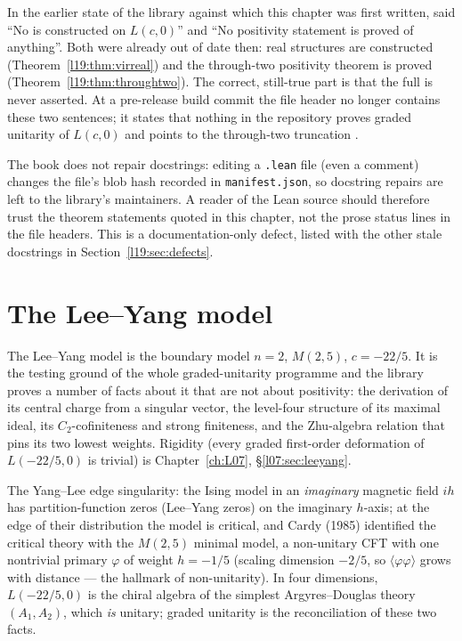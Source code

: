 \begin{warning}[title={Stale status lines in the Virasoro docstrings}]\label{l19:warn:stale}
In the earlier state of the library against which this chapter was first written,
 said ``No  is constructed on
$L(c,0)$'' and ``No positivity statement is proved of anything''. Both were already out of date then: real
structures are constructed (Theorem~\ref{l19:thm:virreal}) and the through-two
positivity theorem is proved (Theorem~\ref{l19:thm:throughtwo}). The correct, still-true part is that the
full  is never asserted. At a pre-release build commit the file header no longer contains these two
sentences; it states that nothing in the repository proves graded unitarity of $L(c,0)$ and points to the
through-two truncation .

The book does not repair docstrings: editing a \texttt{.lean} file (even a comment) changes the file's blob hash
recorded in \texttt{manifest.json}, so docstring repairs are left to the library's maintainers. A reader of the
Lean source should therefore trust the theorem statements quoted in this chapter, not the prose status lines in
the file headers. This is a documentation-only defect, listed with the other stale docstrings in
Section~\ref{l19:sec:defects}.
\end{warning}

\section{The Lee--Yang model}\label{l19:sec:leeyang}

The Lee--Yang model is the boundary model $n=2$, $M(2,5)$, $c = -22/5$. It is the testing ground
of the whole graded-unitarity programme and the library proves a number of facts about it that are
not about positivity: the derivation of its central charge from a singular vector, the level-four
structure of its maximal ideal, its $C_2$-cofiniteness and strong finiteness, and the Zhu-algebra
relation that pins its two lowest weights. Rigidity (every graded first-order deformation of
$L(-22/5,0)$ is trivial) is Chapter~\ref{ch:L07}, \S\ref{l07:sec:leeyang}.

\begin{physics}
The Yang--Lee edge singularity: the Ising model in an \emph{imaginary} magnetic field $ih$ has
partition-function zeros (Lee--Yang zeros) on the imaginary $h$-axis; at the edge of their
distribution the model is critical, and Cardy (1985) identified the critical theory with the
$M(2,5)$ minimal model, a non-unitary CFT with one nontrivial primary $\varphi$ of weight
$h = -1/5$ (scaling dimension $-2/5$, so $\langle\varphi\varphi\rangle$ grows with distance --- the
hallmark of non-unitarity). In four dimensions, $L(-22/5,0)$ is the chiral algebra of the simplest
Argyres--Douglas theory $(A_1,A_2)$, which \emph{is} unitary; graded unitarity is the reconciliation
of these two facts.
\end{physics}

